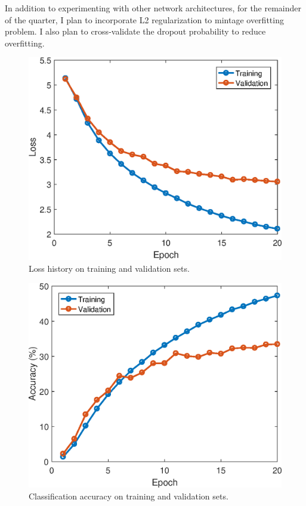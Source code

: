 \documentclass[10pt,twocolumn,letterpaper]{article}
\begin{document}
In addition to experimenting with other network architectures, for the remainder of the quarter, I plan to incorporate L2 regularization to mintage overfitting problem. I also plan to cross-validate the dropout probability to reduce overfitting. 

\begin{figure}[t!]
	\centering
	\includegraphics[width=\linewidth]{figs/milestone_loss.eps}
	\caption{Loss history on training and validation sets.}
	\label{fig:loss}
\end{figure}

\begin{figure}[t!]
	\centering
	\includegraphics[width=\linewidth]{figs/milestone_accuracy.eps}
	\caption{Classification accuracy on training and validation sets.}
	\label{fig:accu}
\end{figure}



{\small


}
\end{document}
